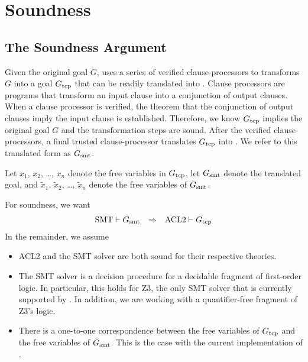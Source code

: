 \chapter{Soundness}
\label{ch:Soundness}

\section{The Soundness Argument}\label{sec:SoundArg}
Given the original goal $G$, \smtlink{} uses a series of verified
clause-processors to transforms $G$ into a goal $G_{\mathrm{tcp}}$ that can be readily
translated into \zthree{}.
Clause processors are programs that transform an input clause into a conjunction
of output clauses.
When a clause processor is verified, the theorem that the conjunction of output
clauses imply the input clause is established.
Therefore, we know $G_{\mathrm{tcp}}$ implies the original goal $G$ and the transformation
steps are sound.
After the verified clause-processors, a final trusted clause-processor
translates $G_{\mathrm{tcp}}$ into \zthree{}. We refer to this translated form as $G_{\mathrm{smt}}$.

Let $x_1$, $x_2$, \ldots, $x_n$ denote the free variables in $G_{\mathrm{tcp}}$,
let $G_{\mathrm{smt}}$ denote the translated goal,
and $\tilde{x}_1$, $\tilde{x}_2$, \ldots, $\tilde{x}_n$ denote
the free variables of $G_{\mathrm{smt}}$.

For soundness, we want
\begin{equation}\label{eq:soundness}\begin{array}{rcl}
\mathrm{SMT} \vdash G_{\mathrm{smt}} &\Rightarrow& \mathrm{ACL2} \vdash G_{\mathrm{tcp}}
\end{array}\end{equation}
In the remainder, we assume
\begin{itemize}
\item ACL2 and the SMT solver are both sound for their respective theories.
\item The SMT solver is a decision procedure for a decidable fragment of first-order logic.
  In particular, this holds for Z3, the only SMT solver that is currently
  supported by \smtlink{}. In addition, we are working with a quantifier-free
  fragment of Z3's logic.
\item There is a one-to-one correspondence between the free variables of $G_{\mathrm{tcp}}$
  and the free variables of $G_{\mathrm{smt}}$.
  This is the case with the current implementation of \smtlink{}.
\end{itemize}

